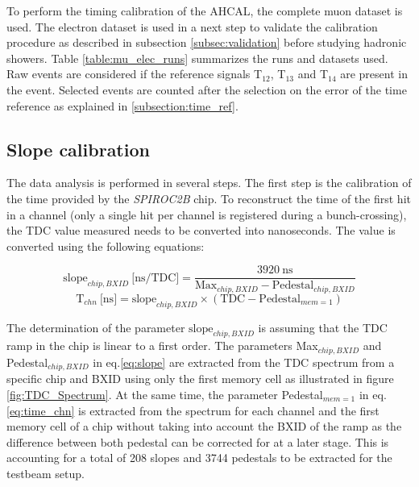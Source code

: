 To perform the timing calibration of the AHCAL, the complete muon dataset is used. The electron dataset is used in a next step to validate the calibration procedure as described in subsection \ref{subsec:validation} before studying hadronic showers. Table \ref{table:mu_elec_runs} summarizes the runs and datasets used. Raw events are considered if the reference signals T$_{12}$,  T$_{13}$ and T$_{14}$ are present in the event. Selected events are counted after the selection on the error of the time reference as explained in \ref{subsection:time_ref}.

\subsection{Slope calibration}
\label{subsec:slope_calib}

The data analysis is performed in several steps. The first step is the calibration of the time provided by the \textit{SPIROC2B} chip. To reconstruct the time of the first hit in a channel (only a single hit per channel is registered during a bunch-crossing), the TDC value measured needs to be converted into nanoseconds. The value is converted using the following equations:

\begin{equation} \label{eq:slope}
	\text{slope}_{chip, BXID} \: \text{[ns/TDC]} = \frac{3920 \: \text{ns}}{\text{Max}_{chip, BXID} - \text{Pedestal}_{chip, BXID}}
\end{equation}
\begin{equation} \label{eq:time_chn}
	\text{T}_{chn} \: \text{[ns]} = \text{slope}_{chip, BXID} \times (\text{TDC} - \text{Pedestal}_{mem=1} )
\end{equation}

The determination of the parameter $\text{slope}_{chip, BXID}$ is assuming that the TDC ramp in the chip is linear to a first order. The parameters Max$_{chip, BXID}$ and Pedestal$_{chip, BXID}$ in eq.\ref{eq:slope} are extracted from the TDC spectrum from a specific chip and BXID using only the first memory cell as illustrated in figure \ref{fig:TDC_Spectrum}. At the same time, the parameter Pedestal$_{mem=1}$ in eq.\ref{eq:time_chn} is extracted from the spectrum for each channel and the first memory cell of a chip without taking into account the BXID of the ramp as the difference between both pedestal can be corrected for at a later stage. This is accounting for a total of 208 slopes and 3744 pedestals to be extracted for the testbeam setup.

